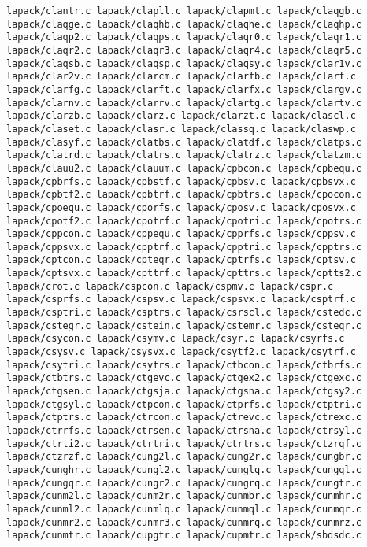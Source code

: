 \documentclass[10pt,a4paper]{article}
\begin{document}
\begin{codeparchment}
\begin{lstlisting}
lapack/clantr.c lapack/clapll.c lapack/clapmt.c lapack/claqgb.c 
lapack/claqge.c lapack/claqhb.c lapack/claqhe.c lapack/claqhp.c 
lapack/claqp2.c lapack/claqps.c lapack/claqr0.c lapack/claqr1.c 
lapack/claqr2.c lapack/claqr3.c lapack/claqr4.c lapack/claqr5.c 
lapack/claqsb.c lapack/claqsp.c lapack/claqsy.c lapack/clar1v.c 
lapack/clar2v.c lapack/clarcm.c lapack/clarfb.c lapack/clarf.c 
lapack/clarfg.c lapack/clarft.c lapack/clarfx.c lapack/clargv.c 
lapack/clarnv.c lapack/clarrv.c lapack/clartg.c lapack/clartv.c 
lapack/clarzb.c lapack/clarz.c lapack/clarzt.c lapack/clascl.c 
lapack/claset.c lapack/clasr.c lapack/classq.c lapack/claswp.c 
lapack/clasyf.c lapack/clatbs.c lapack/clatdf.c lapack/clatps.c 
lapack/clatrd.c lapack/clatrs.c lapack/clatrz.c lapack/clatzm.c 
lapack/clauu2.c lapack/clauum.c lapack/cpbcon.c lapack/cpbequ.c 
lapack/cpbrfs.c lapack/cpbstf.c lapack/cpbsv.c lapack/cpbsvx.c 
lapack/cpbtf2.c lapack/cpbtrf.c lapack/cpbtrs.c lapack/cpocon.c 
lapack/cpoequ.c lapack/cporfs.c lapack/cposv.c lapack/cposvx.c 
lapack/cpotf2.c lapack/cpotrf.c lapack/cpotri.c lapack/cpotrs.c 
lapack/cppcon.c lapack/cppequ.c lapack/cpprfs.c lapack/cppsv.c 
lapack/cppsvx.c lapack/cpptrf.c lapack/cpptri.c lapack/cpptrs.c 
lapack/cptcon.c lapack/cpteqr.c lapack/cptrfs.c lapack/cptsv.c 
lapack/cptsvx.c lapack/cpttrf.c lapack/cpttrs.c lapack/cptts2.c 
lapack/crot.c lapack/cspcon.c lapack/cspmv.c lapack/cspr.c 
lapack/csprfs.c lapack/cspsv.c lapack/cspsvx.c lapack/csptrf.c 
lapack/csptri.c lapack/csptrs.c lapack/csrscl.c lapack/cstedc.c 
lapack/cstegr.c lapack/cstein.c lapack/cstemr.c lapack/csteqr.c 
lapack/csycon.c lapack/csymv.c lapack/csyr.c lapack/csyrfs.c 
lapack/csysv.c lapack/csysvx.c lapack/csytf2.c lapack/csytrf.c 
lapack/csytri.c lapack/csytrs.c lapack/ctbcon.c lapack/ctbrfs.c 
lapack/ctbtrs.c lapack/ctgevc.c lapack/ctgex2.c lapack/ctgexc.c 
lapack/ctgsen.c lapack/ctgsja.c lapack/ctgsna.c lapack/ctgsy2.c 
lapack/ctgsyl.c lapack/ctpcon.c lapack/ctprfs.c lapack/ctptri.c 
lapack/ctptrs.c lapack/ctrcon.c lapack/ctrevc.c lapack/ctrexc.c 
lapack/ctrrfs.c lapack/ctrsen.c lapack/ctrsna.c lapack/ctrsyl.c 
lapack/ctrti2.c lapack/ctrtri.c lapack/ctrtrs.c lapack/ctzrqf.c 
lapack/ctzrzf.c lapack/cung2l.c lapack/cung2r.c lapack/cungbr.c 
lapack/cunghr.c lapack/cungl2.c lapack/cunglq.c lapack/cungql.c 
lapack/cungqr.c lapack/cungr2.c lapack/cungrq.c lapack/cungtr.c 
lapack/cunm2l.c lapack/cunm2r.c lapack/cunmbr.c lapack/cunmhr.c 
lapack/cunml2.c lapack/cunmlq.c lapack/cunmql.c lapack/cunmqr.c 
lapack/cunmr2.c lapack/cunmr3.c lapack/cunmrq.c lapack/cunmrz.c 
lapack/cunmtr.c lapack/cupgtr.c lapack/cupmtr.c lapack/sbdsdc.c 

\end{lstlisting}
\end{codeparchment}
\end{document}
